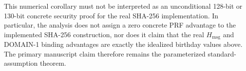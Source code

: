 This numerical corollary must not be interpreted as an unconditional
128-bit or 130-bit concrete security proof for the real SHA-256
implementation. In particular, the analysis does not assign a zero concrete
PRF advantage to the implemented SHA-256 construction, nor does it claim
that the real $H_{\mathrm{msg}}$ and DOMAIN-1 binding advantages are exactly
the idealized birthday values above. The primary manuscript claim therefore
remains the parameterized standard-assumption theorem.


